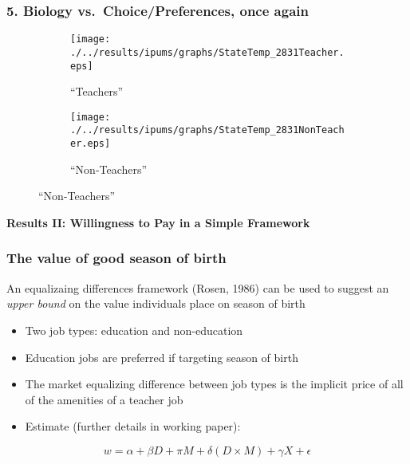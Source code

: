 \documentclass[10pt,letterpaper,subeqn]{beamer}
\begin{document}
 

\begin{frame}
\frametitle{5. Biology vs.\ Choice/Preferences, once again}
\begin{figure}[htpb!]
  \begin{center}
    \caption{Temperature and Good Season: younger mothers (28-31 yo)}
    \label{bqFig:coldTeach2831}
    \begin{subfigure}{.5\textwidth}
      \centering
      \texttt{[image: ./../results/ipums/graphs/StateTemp\_2831Teacher.eps]}
      \caption{``Teachers''}
      \label{fig:Educ1}
    \end{subfigure}%
    \begin{subfigure}{.5\textwidth}
      \centering
      \texttt{[image: ./../results/ipums/graphs/StateTemp\_2831NonTeacher.eps]}
      \caption{``Non-Teachers''}
      \label{fig:NonEduc1}
    \end{subfigure}
  \end{center}
 \end{figure}
\end{frame}


\begin{frame}
  \begin{center}
    \textbf{Results II: Willingness to Pay in a Simple Framework}
  \end{center}
\end{frame}

\begin{frame}[label=equalizingDiff]
\frametitle{The value of good season of birth}
An equalizaing differences framework (Rosen, 1986) can be used to suggest an \emph{upper bound}
on the value individuals place on season of birth
\begin{itemize}
\item Two job types: education and non-education
\item Education jobs are preferred if targeting season of birth
\item The market equalizing difference between job types is the implicit price of all of the amenities
  of a teacher job
\item Estimate (further details in working paper):
\end{itemize}
\[
w = \alpha + \beta D + \pi M + \delta (D \times M) + \gamma X +  \epsilon
\]
\end{frame}
\end{document}
